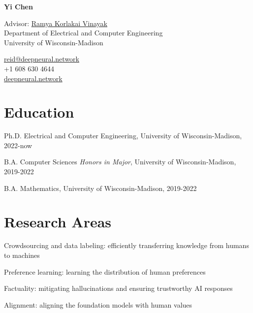 \documentclass[11pt,letterpaper]{report}
\newcommand{\myname}{Yi Chen}
\newcommand{\namefont}[1]{{\normalfont\bfseries\Huge{#1}}}
\newcommand{\listitemspace}{0.25em}
\renewenvironment{itemize}
{\begin{list}{}{\setlength{\leftmargin}{0em}
                \setlength{\parskip}{0em}
                \setlength{\itemsep}{\listitemspace}
                \setlength{\parsep}{\listitemspace}}}
{\end{list}}
\begin{document}
    \raggedright{}

    \namefont{\myname}

    \vspace{1em}
    \begin{minipage}[t]{0.700\textwidth}
        Advisor: \href{https://ramyakv.github.io/}{Ramya Korlakai Vinayak} \\
        Department of Electrical and Computer Engineering \\
        University of Wisconsin-Madison
    \end{minipage}
    \begin{minipage}[t]{0.295\textwidth}
        \flushright{}
        \href{mailto:reid@deepneural.network}{reid@deepneural.network} \\
        +1 608 630 4644 \\
        \href{https://www.deepneural.network/}{deepneural.network}
    \end{minipage}


    \section*{Education}

    \begin{tablist}

        \item[Ph.D.]  \tab{} Electrical and Computer Engineering, University of Wisconsin-Madison, 2022-now
        \item[B.A.]  \tab{} Computer Sciences \textit{Honors in Major}, University of Wisconsin-Madison, 2019-2022
        \item[B.A.]  \tab{} Mathematics, University of Wisconsin-Madison, 2019-2022

    \end{tablist}



    \section*{Research Areas}

    \begin{itemize}
        \item Crowdsourcing and data labeling: efficiently transferring knowledge from humans to machines
        \item Preference learning: learning the distribution of human preferences
        \item Factuality: mitigating hallucinations and ensuring trustworthy AI responses
        \item Alignment: aligning the foundation models with human values
    \end{itemize}    
\end{document}

